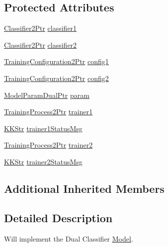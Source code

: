 \subsection*{Protected Attributes}
\begin{DoxyCompactItemize}
\item 
\hyperlink{namespace_k_k_m_l_l_ae49327d641e08f01c40df84678fad11e}{Classifier2\+Ptr} \hyperlink{class_k_k_m_l_l_1_1_model_dual_a702b5e302cc05ab6cdc3ee4ae8115622}{classifier1}
\item 
\hyperlink{namespace_k_k_m_l_l_ae49327d641e08f01c40df84678fad11e}{Classifier2\+Ptr} \hyperlink{class_k_k_m_l_l_1_1_model_dual_a18ed538fadc0cb3eebdb9175ccce22e2}{classifier2}
\item 
\hyperlink{namespace_k_k_m_l_l_a5da4b334417f8c9e4e2fd5924da7fe62}{Training\+Configuration2\+Ptr} \hyperlink{class_k_k_m_l_l_1_1_model_dual_a1d0f07c3ee783f1f91bcb5436c968908}{config1}
\item 
\hyperlink{namespace_k_k_m_l_l_a5da4b334417f8c9e4e2fd5924da7fe62}{Training\+Configuration2\+Ptr} \hyperlink{class_k_k_m_l_l_1_1_model_dual_ae3a785cf1484bb40abe8d090312e6061}{config2}
\item 
\hyperlink{namespace_k_k_m_l_l_ac0d00af7c9dc9b90ef0ce1a91ccd1c40}{Model\+Param\+Dual\+Ptr} \hyperlink{class_k_k_m_l_l_1_1_model_dual_ac78b32cfbe102267574423e84aba9e42}{param}
\item 
\hyperlink{namespace_k_k_m_l_l_a1fd087a9fde5db46fe14f6e98f994a71}{Training\+Process2\+Ptr} \hyperlink{class_k_k_m_l_l_1_1_model_dual_ac70e06e4290a0eca3cb79892170fdf6c}{trainer1}
\item 
\hyperlink{class_k_k_b_1_1_k_k_str}{K\+K\+Str} \hyperlink{class_k_k_m_l_l_1_1_model_dual_a0dbaa3609d1b64535961a22863e206af}{trainer1\+Status\+Msg}
\item 
\hyperlink{namespace_k_k_m_l_l_a1fd087a9fde5db46fe14f6e98f994a71}{Training\+Process2\+Ptr} \hyperlink{class_k_k_m_l_l_1_1_model_dual_aed7b1f99f54b08770555fb1e9c5d4b21}{trainer2}
\item 
\hyperlink{class_k_k_b_1_1_k_k_str}{K\+K\+Str} \hyperlink{class_k_k_m_l_l_1_1_model_dual_a61010c9eeb9ff562ffc107527432bd1d}{trainer2\+Status\+Msg}
\end{DoxyCompactItemize}
\subsection*{Additional Inherited Members}


\subsection{Detailed Description}
Will implement the Dual Classifier \hyperlink{class_k_k_m_l_l_1_1_model}{Model}. 

